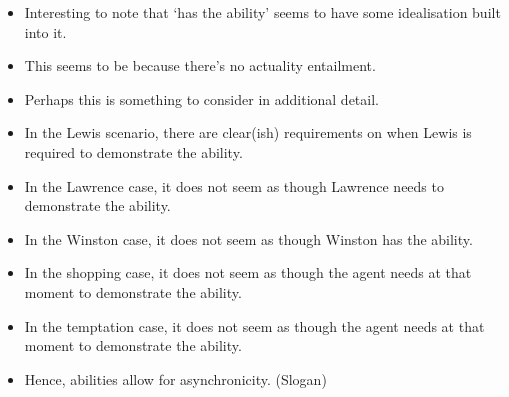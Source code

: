 \documentclass[10pt]{article}
\begin{document}
\begin{itemize}
\item Interesting to note that `has the ability' seems to have some idealisation built into it.
\item This seems to be because there's no actuality entailment.
\item Perhaps this is something to consider in additional detail.
\end{itemize}

\begin{itemize}
\item In the Lewis scenario, there are clear(ish) requirements on when Lewis is required to demonstrate the ability.
\item In the Lawrence case, it does not seem as though Lawrence needs to demonstrate the ability.
\item In the Winston case, it does not seem as though Winston has the ability.
\item In the shopping case, it does not seem as though the agent needs at that moment to demonstrate the ability.
\item In the temptation case, it does not seem as though the agent needs at that moment to demonstrate the ability.
\item Hence, abilities allow for asynchronicity. (Slogan)

\end{itemize}

\newpage
\end{document}
